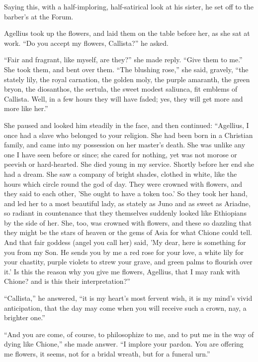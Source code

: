 Saying this, with a half-imploring, half-satirical look at his
sister, he set off to the barber's at the Forum.

Agellius took up the flowers, and laid them on the table before
her, as she sat at work. ``Do you accept my flowers, Callista?''
he asked.

``Fair and fragrant, like myself, are they?'' she made
reply. ``Give them to me.'' She took them, and bent over them.
``The blushing rose,'' she said, gravely, ``the
stately lily, the royal carnation, the golden moly, the purple
amaranth, the green bryon, the diosanthos, the sertula, the sweet
modest saliunca, fit emblems of Callista. Well, in a few hours they
will have faded; yes, they will get more and more like her.''

She paused and looked him steadily in the face, and then continued:
``Agellius, I once had a slave who belonged to your religion. She
had been born in a Christian family, and came into my possession on
her master's death. She was unlike any one I have seen before or
since; she cared for nothing, yet was not morose or peevish or
hard-hearted. She died young in my service. Shortly before her end she
had a dream. She saw a company of bright shades, clothed in white,
like the hours which circle round the god of day. They were crowned
with flowers, and they said to each other, 'She ought to have a token
too.' So they took her hand, and led her to a most beautiful lady, as
stately as Juno and as sweet as Ariadne, so radiant in countenance
that they themselves suddenly looked like Ethiopians by the side of
her. She, too, was crowned with flowers, and these so dazzling that
they might be the stars of heaven or the gems of Asia for what Chione
could tell. And that fair goddess (angel you call her) said, 'My dear,
here is something for you from my Son. He sends you by me a red rose
for your love, a white lily for your chastity, purple violets to strew
your grave, and green palms to flourish over it.' Is this the reason
why you give me flowers, Agellius, that I may rank with Chione?
and is this their interpretation?''

``Callista,'' he answered, ``it is my heart's most
fervent wish, it is my mind's vivid anticipation, that the day may
come when you will receive such a crown, nay, a brighter one.''

``And you are come, of course, to philosophize to me, and to
put me in the way of dying like Chione,'' she made answer. ``I
implore your pardon. You are offering me flowers, it seems, not for a
bridal wreath, but for a funeral urn.''

